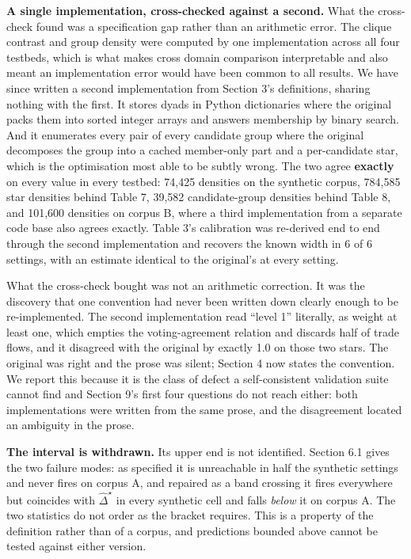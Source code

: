\documentclass[twoside,11pt]{article}
\begin{document}
\textbf{A single implementation, cross-checked against a second.} What the cross-check found was a specification gap rather than an arithmetic error. The clique contrast and group density were computed by one implementation across all four testbeds, which is what makes cross domain comparison interpretable and also meant an implementation error would have been common to all results. We have since written a second implementation from Section 3's definitions, sharing nothing with the first. It stores dyads in Python dictionaries where the original packs them into sorted integer arrays and answers membership by binary search. And it enumerates every pair of every candidate group where the original decomposes the group into a cached member-only part and a per-candidate star, which is the optimisation most able to be subtly wrong. The two agree \textbf{exactly} on every value in every testbed: 74,425 densities on the synthetic corpus, 784,585 star densities behind Table 7, 39,582 candidate-group densities behind Table 8, and 101,600 densities on corpus B, where a third implementation from a separate code base also agrees exactly. Table 3's calibration was re-derived end to end through the second implementation and recovers the known width in 6 of 6 settings, with an estimate identical to the original's at every setting.

What the cross-check bought was not an arithmetic correction. It was the discovery that one convention had never been written down clearly enough to be re-implemented. The second implementation read ``level 1'' literally, as weight at least one, which empties the voting-agreement relation and discards half of trade flows, and it disagreed with the original by exactly 1.0 on those two stars. The original was right and the prose was silent; Section 4 now states the convention. We report this because it is the class of defect a self-consistent validation suite cannot find and Section 9's first four questions do not reach either: both implementations were written from the same prose, and the disagreement located an ambiguity in the prose.

\textbf{The interval is withdrawn.} Its upper end is not identified. Section 6.1 gives the two failure modes: as specified it is unreachable in half the synthetic settings and never fires on corpus A, and repaired as a band crossing it fires everywhere but coincides with \({\widehat{\Delta}}^{\star}\) in every synthetic cell and falls \emph{below} it on corpus A. The two statistics do not order as the bracket requires. This is a property of the definition rather than of a corpus, and predictions bounded above cannot be tested against either version.
\end{document}
